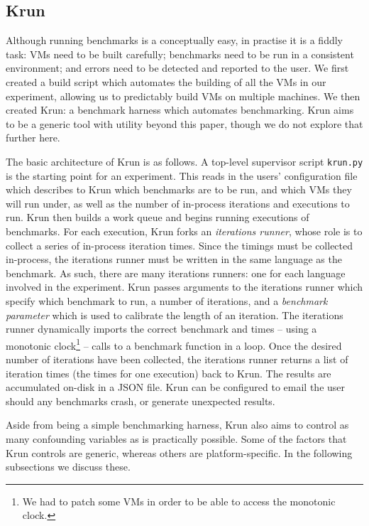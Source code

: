 \documentclass[10pt,preprint]{sigplanconf}
\newcommand{\krun}{Krun\xspace}
\begin{document}
\subsection{\krun}

Although running benchmarks is a conceptually easy, in practise it is a fiddly task:
VMs need to be built carefully; benchmarks need to be run in a consistent
environment; and errors need to be detected and reported to the user. We first created
a build script which automates the building of all the VMs in our experiment, allowing
us to predictably build VMs on multiple machines. We then created \krun: a
benchmark harness which automates benchmarking. \krun aims to be a generic tool
with utility beyond this paper, though we do not explore that further here.

The basic architecture of \krun is as follows. A top-level supervisor script
\texttt{krun.py} is the starting point for an experiment. This reads in the
users' configuration file which describes to \krun which benchmarks are to be run, and
which VMs they will run under, as well as the number of in-process iterations
and executions to run. \krun then builds a work queue and begins running
executions of benchmarks. For each execution, \krun forks an \emph{iterations
runner}, whose role is to collect a series of in-process iteration times. Since
the timings must be collected in-process, the iterations runner must be written
in the same language as the benchmark. As such, there are many iterations
runners: one for each language involved in the experiment. \krun passes
arguments to the iterations runner which specify which benchmark to run, a
number of iterations, and a \emph{benchmark parameter} which is used to
calibrate the length of an iteration. The iterations runner dynamically imports
the correct benchmark and times -- using a monotonic clock\footnote{We had to
patch some VMs in order to be able to access the monotonic clock.} -- calls to
a benchmark function in a loop. Once
the desired number of iterations have been collected, the iterations runner
returns a list of iteration times (the times for one execution) back to \krun.
The results are accumulated on-disk in a JSON file. \krun can be configured to
email the user should any benchmarks crash, or generate unexpected results.

Aside from being a simple benchmarking harness, \krun also aims to control as
many confounding variables as is practically possible. Some of the factors that
\krun controls are generic, whereas others are platform-specific. In the
following subsections we discuss these.
\end{document}

